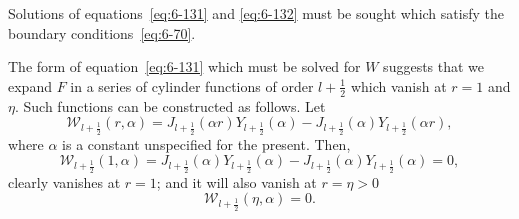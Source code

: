 Solutions of equations~\eqref{eq:6-131} and \eqref{eq:6-132} must be sought which satisfy the
boundary conditions~\eqref{eq:6-70}.

The form of equation~\eqref{eq:6-131} which must be solved for $W$ suggests that
we expand $F$ in a series of cylinder functions of order $l+\frac{1}{2}$ which vanish
at $r = 1$ and $\eta$. Such functions can be constructed as follows. Let
\begin{equation}\label{eq:6-134}
\mathscr{W}_{l+\frac{1}{2}}(r,\alpha) = J_{l+\frac{1}{2}}(\alpha r)Y_{l+\frac{1}{2}}(\alpha) - J_{l+\frac{1}{2}}(\alpha)Y_{l+\frac{1}{2}}(\alpha r),
\end{equation}
where $\alpha$ is a constant unspecified for the present. Then,
\begin{equation}\label{eq:6-135}
\mathscr{W}_{l+\frac{1}{2}}(1,\alpha) = J_{l+\frac{1}{2}}(\alpha)Y_{l+\frac{1}{2}}(\alpha) - J_{l+\frac{1}{2}}(\alpha)Y_{l+\frac{1}{2}}(\alpha) = 0,
\end{equation}
clearly vanishes at $r = 1$; and it will also vanish at $r = \eta > 0$
\begin{equation}\label{eq:6-136}
\mathscr{W}_{l+\frac{1}{2}}(\eta,\alpha) = 0.
\end{equation}

